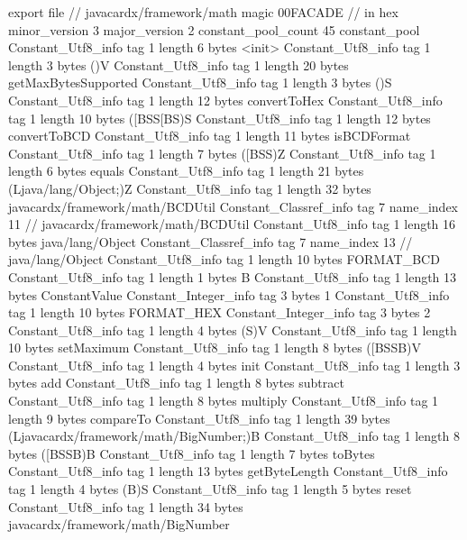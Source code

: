 export file {		// javacardx/framework/math
	magic	00FACADE		 // in hex
	minor_version	3
	major_version	2
	constant_pool_count	45
	constant_pool {
		Constant_Utf8_info {
			tag	1
			length	6
			bytes	<init>
		}
		Constant_Utf8_info {
			tag	1
			length	3
			bytes	()V
		}
		Constant_Utf8_info {
			tag	1
			length	20
			bytes	getMaxBytesSupported
		}
		Constant_Utf8_info {
			tag	1
			length	3
			bytes	()S
		}
		Constant_Utf8_info {
			tag	1
			length	12
			bytes	convertToHex
		}
		Constant_Utf8_info {
			tag	1
			length	10
			bytes	([BSS[BS)S
		}
		Constant_Utf8_info {
			tag	1
			length	12
			bytes	convertToBCD
		}
		Constant_Utf8_info {
			tag	1
			length	11
			bytes	isBCDFormat
		}
		Constant_Utf8_info {
			tag	1
			length	7
			bytes	([BSS)Z
		}
		Constant_Utf8_info {
			tag	1
			length	6
			bytes	equals
		}
		Constant_Utf8_info {
			tag	1
			length	21
			bytes	(Ljava/lang/Object;)Z
		}
		Constant_Utf8_info {
			tag	1
			length	32
			bytes	javacardx/framework/math/BCDUtil
		}
		Constant_Classref_info {
			tag	7
			name_index	11		// javacardx/framework/math/BCDUtil
		}
		Constant_Utf8_info {
			tag	1
			length	16
			bytes	java/lang/Object
		}
		Constant_Classref_info {
			tag	7
			name_index	13		// java/lang/Object
		}
		Constant_Utf8_info {
			tag	1
			length	10
			bytes	FORMAT_BCD
		}
		Constant_Utf8_info {
			tag	1
			length	1
			bytes	B
		}
		Constant_Utf8_info {
			tag	1
			length	13
			bytes	ConstantValue
		}
		Constant_Integer_info {
			tag	3
			bytes	1
		}
		Constant_Utf8_info {
			tag	1
			length	10
			bytes	FORMAT_HEX
		}
		Constant_Integer_info {
			tag	3
			bytes	2
		}
		Constant_Utf8_info {
			tag	1
			length	4
			bytes	(S)V
		}
		Constant_Utf8_info {
			tag	1
			length	10
			bytes	setMaximum
		}
		Constant_Utf8_info {
			tag	1
			length	8
			bytes	([BSSB)V
		}
		Constant_Utf8_info {
			tag	1
			length	4
			bytes	init
		}
		Constant_Utf8_info {
			tag	1
			length	3
			bytes	add
		}
		Constant_Utf8_info {
			tag	1
			length	8
			bytes	subtract
		}
		Constant_Utf8_info {
			tag	1
			length	8
			bytes	multiply
		}
		Constant_Utf8_info {
			tag	1
			length	9
			bytes	compareTo
		}
		Constant_Utf8_info {
			tag	1
			length	39
			bytes	(Ljavacardx/framework/math/BigNumber;)B
		}
		Constant_Utf8_info {
			tag	1
			length	8
			bytes	([BSSB)B
		}
		Constant_Utf8_info {
			tag	1
			length	7
			bytes	toBytes
		}
		Constant_Utf8_info {
			tag	1
			length	13
			bytes	getByteLength
		}
		Constant_Utf8_info {
			tag	1
			length	4
			bytes	(B)S
		}
		Constant_Utf8_info {
			tag	1
			length	5
			bytes	reset
		}
		Constant_Utf8_info {
			tag	1
			length	34
			bytes	javacardx/framework/math/BigNumber
}}}
